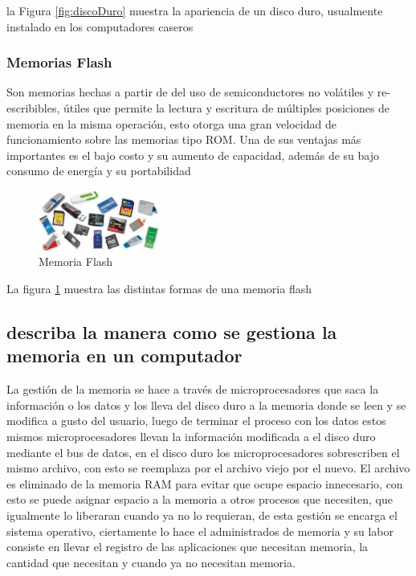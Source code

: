 \documentclass{article}
\begin{document}
        la Figura \ref{fig:discoDuro} muestra la apariencia de un disco duro, usualmente instalado en los computadores caseros 
        
        \subsubsection{Memorias Flash}
        Son memorias hechas a partir de del uso de semiconductores no volátiles y re-escribibles, útiles que permite la lectura y escritura de múltiples posiciones de memoria en la misma operación, esto otorga una gran velocidad de funcionamiento sobre las memorias tipo ROM. Una de sus ventajas más importantes es el bajo costo y su aumento de capacidad, además de su bajo consumo de energía y su portabilidad 
        
        \begin{figure}[h]
        \includegraphics[width=4cm]{flash.jpg}
        \centering
        \caption{Memoria Flash}
        \label{fig:flash}
        \end{figure}
        
        La figura \ref{fig:flash} muestra las distintas formas de una memoria flash
    
    \subsection{describa la manera como se gestiona la memoria en un computador}
    La gestión de la memoria se hace a través de microprocesadores que saca la información o los datos y los lleva del disco duro a la memoria donde se  leen y se modifica a gusto del usuario, luego de terminar el proceso con los datos estos mismos microprocesadores llevan la información modificada a el disco duro mediante el bus de datos, en el disco duro los microprocesadores sobrescriben el mismo archivo, con esto se reemplaza por el archivo viejo por el nuevo. 
    El archivo es eliminado de la memoria RAM para evitar que ocupe espacio innecesario, con esto se puede asignar espacio a la memoria a otros procesos que necesiten, que igualmente lo liberaran cuando ya no lo requieran, de esta gestión se encarga el sistema operativo, ciertamente lo hace el administrados de memoria y su labor consiste en llevar el registro de las aplicaciones que necesitan memoria, la cantidad que necesitan y cuando ya no necesitan memoria.
 
\end{document}
